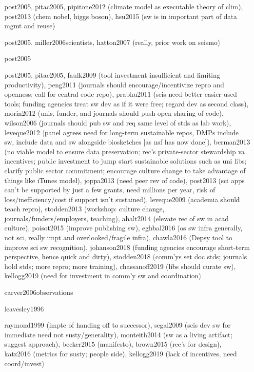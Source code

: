 \documentclass[12pt]{amsart}
\begin{document}
post2005, pitac2005, pipitone2012 (climate model as executable theory of clim), post2013 (chem nobel, higgs boson), hsu2015 (sw is in important part of data mgmt and reuse)

post2005, miller2006scientists, hatton2007 (really, prior work on seismo)

post2005

post2005, pitac2005, faulk2009 (tool investment insufficient and limiting productivity), peng2011 (journals should encourage/incentivize repro and openness; call for central code repo), prabhu2011 (scis need better easier-used tools; funding agencies treat sw dev as if it were free; regard dev as second class), morin2012 (unis, funder, and journals should push open sharing of code), wilson2006 (journals should pub sw and req same level of stds as lab work), leveque2012 (panel agrees need for long-term sustainable repos, DMPs include sw, include data and sw alongside biosketches [as nsf has now done]), berman2013 (no viable model to ensure data preservation; rec's private-sector stewardship va incentives; public investment to jump start sustainable solutions such as uni libs; clarify public sector commitment; encourage culture change to take advantage of things like iTunes model), joppa2013 (need peer rev of code), post2013 (sci apps can't be supported by just a few grants, need millions per year, risk of loss/inefficiency/cost if support isn't sustained), leveque2009 (academia should teach repro), stodden2013 (workshop: culture change, journals/funders/employers, teaching), ahalt2014 (elevate rec of sw in acad culture), poisot2015 (improve publishing sw), eghbal2016 (os sw infra generally, not sci, really impt and overlooked/fragile infra), chawla2016 (Depsy tool to improve sci sw recognition), johanson2018 (funding agencies encourage short-term perspective, hence quick and dirty), stodden2018 (comm'ys set doc stds; journals hold stds; more repro; more training), chassanoff2019 (libs should curate sw), kellogg2019 (need for investment in comm'y sw and coordination)

carver2006observations

leavesley1996

raymond1999 (imptc of handing off to successor), segal2009 (scis dev sw for immediate need not susty/generality), monteith2014 (sw as a living artifact; suggest approach), becker2015 (manifesto), brown2015 (rec's for design), katz2016 (metrics for susty; people side), kellogg2019 (lack of incentives, need coord/invest)
\end{document}
